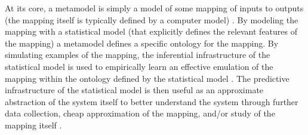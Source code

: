 %
At its core, a metamodel is simply a model of some mapping of inputs to outputs
(the mapping itself is typically defined by a computer model) \cite{santner_space-filling_2003}. 
By modeling the mapping with a statistical model (that explicitly defines the relevant features of the
mapping) a metamodel defines a specific ontology for the mapping.
By simulating examples of the mapping, the inferential infrastructure of the
statistical model is used to empirically learn an effective emulation of the
mapping within the ontology defined by the statistical model \cite{gramacy_surrogates_2020}. %
The predictive infrastructure of the statistical model is then useful as an
approximate abstraction of the system itself to better understand the system
through further data collection, cheap approximation of the mapping, and/or study
of the mapping itself \cite{friedman_simulation_2012}. 


